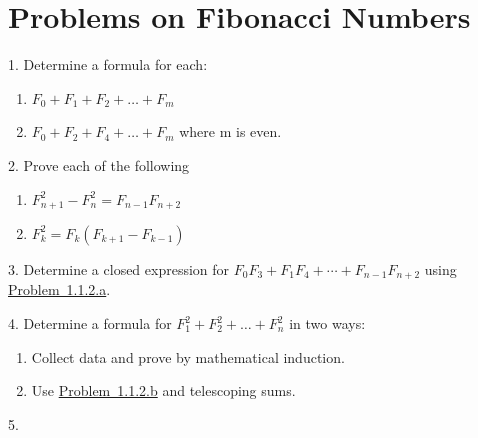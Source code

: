 \documentclass[10pt,]{book}
\theoremstyle{plain}
\theoremstyle{definition}
\theoremstyle{definition}
\numberwithin{equation}{chapter}
\begin{document}
\section[{Problems on Fibonacci Numbers}]{Problems on Fibonacci Numbers}\label{exercises-1}
\begin{exerciselist}
\item[1.]\hypertarget{exercise-1}{}\hypertarget{p-18}{}%
Determine a formula for each:%
\leavevmode%
\begin{enumerate}[label=(\alph*)]
\item\hypertarget{li-1}{}\hypertarget{p-19}{}%
\(F_{0} + F_{1} + F_{2} + \ldots + F_{m}\)%
\item\hypertarget{li-2}{}\hypertarget{p-20}{}%
\(F_{0} + F_{2} + F_{4} + \ldots + F_{m}\) where m is even.%
\end{enumerate}
\par\smallskip
\item[2.]\hypertarget{exercise-2}{}\hypertarget{p-21}{}%
Prove each of the following%
\leavevmode%
\begin{enumerate}[label=(\alph*)]
\item\hypertarget{diff-fib-squares}{}\hypertarget{p-22}{}%
\(F_{n + 1}^{2} - F_{n}^{2} = F_{n - 1}F_{n + 2}\)%
\item\hypertarget{fib-squares}{}\hypertarget{p-23}{}%
\(F_{k}^{2} = F_{k}(F_{k + 1} - F_{k - 1})\)%
\end{enumerate}
\par\smallskip
\item[3.]\hypertarget{exercise-3}{}\hypertarget{p-24}{}%
Determine a closed expression for \(F_{0}F_{3}
+ F_{1}F_{4} + \cdots +
F_{n-1}F_{n+2}\) using \hyperlink{diff-fib-squares}{Problem~1.1.2.a}.%
\par\smallskip
\item[4.]\hypertarget{fib-sum-squares}{}\hypertarget{p-25}{}%
Determine a formula for \(F_{1}^{2} + F_{2}^{2} + \ldots + F_{n}^{2}\) in two ways:%
\leavevmode%
\begin{enumerate}[label=(\alph*)]
\item\hypertarget{li-5}{}\hypertarget{p-26}{}%
Collect data and prove by mathematical induction.%
\item\hypertarget{li-6}{}\hypertarget{p-27}{}%
Use \hyperlink{fib-squares}{Problem~1.1.2.b} and telescoping sums.%
\end{enumerate}
\par\smallskip
\item[5.]\hypertarget{exercise-5}{}\hypertarget{p-28}{}%

\end{exerciselist}
\end{document}
